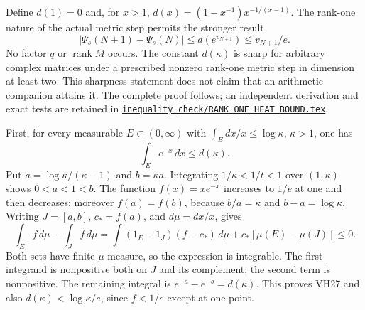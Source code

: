 \documentclass[11pt]{article}
\begin{document}
Define \(d(1)=0\) and, for \(x>1\),
\(d(x)=(1-x^{-1})x^{-1/(x-1)}\). The rank-one nature of the actual
metric step permits the stronger result
\begin{equation}\tag{VH26}\label{VH26}
\boxed{\quad
|\Psi_s(N+1)-\Psi_s(N)|\le d(e^{v_{N+1}})
\le v_{N+1}/e.\quad}
\end{equation}
No factor \(q\) or \(\operatorname{rank}M\) occurs. The constant
\(d(\kappa)\) is sharp for arbitrary complex matrices under a prescribed
nonzero rank-one metric step in dimension at least two. This sharpness
statement does not claim that an arithmetic companion attains it.
The complete proof follows; an independent derivation and exact tests
are retained in \href{https://github.com/KokunoYumeto/zeta-function-research-reader/blob/5992ad50c0f2a06921f1fcaded7b4e38097c0739/workbenches/splitzero-tandem/continuations/20260920-original-kernel-mixed-determinants/providers/RANK_ONE_HEAT_BOUND.tex\#L1}{\texttt{inequality\_check/RANK\_ONE\_HEAT\_BOUND.tex}}.

First, for every measurable \(E\subset(0,\infty)\) with
\(\int_E dx/x\le\log\kappa\), \(\kappa>1\), one has
\begin{equation}\tag{VH27}\label{VH27}
\int_E e^{-x}\,dx\le d(\kappa).
\end{equation}
Put \(a=\log\kappa/(\kappa-1)\) and \(b=\kappa a\).
Integrating \(1/\kappa<1/t<1\) over \((1,\kappa)\) shows
\(0<a<1<b\). The function \(f(x)=xe^{-x}\) increases to \(1/e\)
at one and then decreases; moreover \(f(a)=f(b)\), because
\(b/a=\kappa\) and \(b-a=\log\kappa\).
Writing \(J=[a,b]\), \(c_*=f(a)\), and \(d\mu=dx/x\), gives
\[
\int_E f\,d\mu-\int_J f\,d\mu
=\int(1_E-1_J)(f-c_*)\,d\mu
+c_*[\mu(E)-\mu(J)]\le0.
\]
Both sets have finite \(\mu\)-measure, so the expression is integrable.
The first integrand is nonpositive both on \(J\) and its complement;
the second term is nonpositive. The remaining integral is
\(e^{-a}-e^{-b}=d(\kappa)\). This proves VH27 and also
\(d(\kappa)<\log\kappa/e\), since \(f<1/e\) except at one point.
\end{document}
